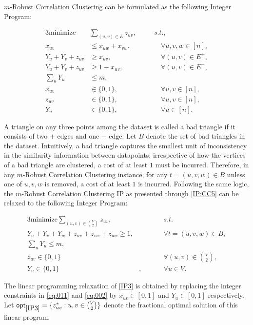 $m$-Robust Correlation Clustering can be formulated as the following Integer Program:

\begin{alignat}{3} \label{IP:CC5}
		\text{minimize} &\sum_{(u,v) \in E} z_{uv}, && \quad s.t., \tag{IP4}\\
		x_{uv} &\le x_{uw} + x_{vw}, &&\qquad \forall u,v,w \in [n], \nonumber\\
		Y_u + Y_v + z_{uv} &\ge x_{uv},&&\qquad \forall (u,v) \in E^+, \nonumber\\
		Y_u + Y_v + z_{uv} &\ge 1 - x_{uv}, &&\qquad \forall (u,v) \in E^-, \nonumber\\
		\sum_{u} Y_u &\le m, \nonumber \\
		x_{uv} &\in \{ 0,1 \}, &&\qquad \forall u,v \in [n],\label{eq:d01}\\
		z_{uv} &\in \{ 0,1 \}, &&\qquad \forall u,v \in [n],\label{eq:d02}\\
		Y_u &\in \{ 0,1 \}, &&\qquad \forall u \in [n]. \label{eq:d03}
\end{alignat}

A triangle on any three points among the dataset is called a bad triangle if it consists of two $+$ edges and one $-$ edge. Let $B$ denote the set of bad triangles in the dataset. Intuitively, a bad triangle captures the smallest unit of inconsistency in the similarity information between datapoints: irrespective of how the vertices of a bad triangle are clustered, a cost of at least $1$ must be incurred. Therefore, in any $m$-Robust Correlation Clustering instance, for any $t = (u,v,w) \in B$ unless one of $u,v,w$ is removed, a cost of at least $1$ is incurred. Following the same logic, the $m$-Robust Correlation Clustering IP as presented through \ref{IP:CC5} can be relaxed to the following Integer Program:

\begin{alignat}{3}
    \text{minimize} \sum_{(u,v) \in \binom{V}{2}} z_{uv},& &&s.t. \label{IP3}\tag{IP3}\\
    Y_u + Y_v + Y_w + z_{uv} + z_{vw} + z_{uw} \ge 1,& &&\forall t = (u,v,w) \in B , \nonumber\\
    \sum_{u} Y_u \le m, & \nonumber\\
	z_{uv} \in \{ 0,1 \}&\qquad && \forall (u,v) \in \binom{V}{2}, \label{eq:011} \\
	Y_u \in \{0,1\}&, && \forall u \in V. \label{eq:002}
\end{alignat}

The linear programming relaxation of \ref{IP3} is obtained by replacing the integer constraints in \eqref{eq:011} and \eqref{eq:002} by $x_{uv} \in [0,1]$ and $Y_u \in[0,1]$ respectively. Let $\mathsf{opt}_{\ref{IP3}} = \{ z^*_{uv} : u,v \in \binom{V}{2} \}$ denote the fractional optimal solution of this linear program.

